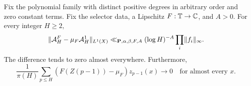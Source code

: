 \begin{proposition}\label{p:ergodic-comparison}
\leanok
{}
Fix the polynomial family with distinct positive degrees in arbitrary
order and zero constant terms. Fix the selector data, a Lipschitz
$F:\mathbb T\to\mathbb C$, and $A>0$. For every integer $H\ge2$,
\[
 \lVert\mathcal A_H^F-\mu_F\mathcal A_H^1\rVert_{L^1(X)}
 \ll_{\mathbf P,\alpha,\beta,F,A}
    (\log H)^{-A}\prod_i\lVert f_i\rVert_\infty.
\]
The difference tends to zero almost everywhere. Furthermore,
\[
 \frac1{\pi(H)}\sum_{p\le H}
   (F(Z(p-1))-\mu_F)z_{p-1}(x)\longrightarrow0
 \quad\text{for almost every }x .
\]
\end{proposition}
